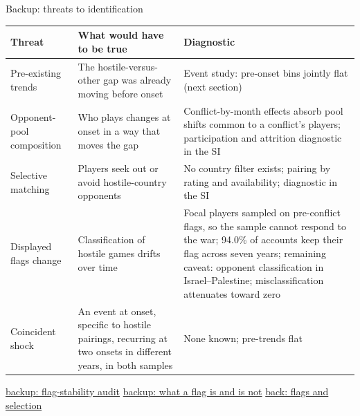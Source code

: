 \documentclass[aspectratio=169,11pt,t]{beamer}
\newcommand{\bk}[2]{\hyperlink{#1}{\textcolor{linkblue}{\scriptsize\textsf{backup: #2}}}}
\newcommand{\links}[1]{\vfill\hfill{#1}}
\begin{document}
\begin{frame}[label=threats]{Backup: threats to identification}
  \scriptsize
  \begin{tabular}{@{}p{}p{}p{}@{}}
    \toprule
    Threat & What would have to be true & Diagnostic \\
    \midrule
    Pre-existing trends & The hostile-versus-other gap was already moving before onset & Event study: pre-onset bins jointly flat (next section) \\[1.5mm]
    Opponent-pool composition & Who plays changes at onset in a way that moves the gap & Conflict-by-month effects absorb pool shifts common to a conflict's players; participation and attrition diagnostic in the SI \\[1.5mm]
    Selective matching & Players seek out or avoid hostile-country opponents & No country filter exists; pairing by rating and availability; diagnostic in the SI \\[1.5mm]
    Displayed flags change & Classification of hostile games drifts over time & Focal players sampled on pre-conflict flags, so the sample cannot respond to the war; 94.0\% of accounts keep their flag across seven years; remaining caveat: opponent classification in Israel--Palestine; misclassification attenuates toward zero \\[1.5mm]
    Coincident shock & An event at onset, specific to hostile pairings, recurring at two onsets in different years, in both samples & None known; pre-trends flat \\
    \bottomrule
  \end{tabular}
  \links{\bk{bk-flags}{flag-stability audit} \quad \bk{bk-flagmeaning}{what a flag is and is not} \quad \hyperlink{flags}{\textcolor{linkblue}{\scriptsize\textsf{back: flags and selection}}}}
\end{frame}
\end{document}
